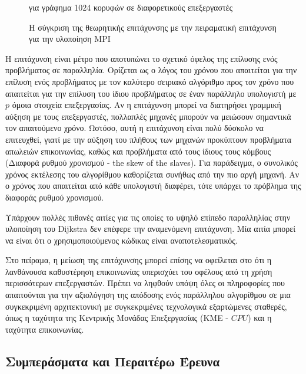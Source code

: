 \documentclass[12pt,a4paper]{article} %
\begin{document}
{\begin{figure}[H]
\caption{Η σύγκριση της θεωρητικής επιτάχυνσης με την πειραματική επιτάχυνση για την υλοποίηση MPI} για γράφημα 1024 κορυφών σε διαφορετικούς επεξεργαστές
\label{fig:speedup_processors}
\end{figure}
 
Η επιτάχυνση είναι μέτρο που αποτυπώνει το σχετικό όφελος της επίλυσης ενός προβλήματος σε παραλληλία. Ορίζεται ως ο λόγος του χρόνου που απαιτείται για την επίλυση ενός προβλήματος με τον καλύτερο σειριακό αλγόριθμο προς τον χρόνο που απαιτείται για την επίλυση του ίδιου προβλήματος σε έναν παράλληλο υπολογιστή με $p$ όμοια στοιχεία επεξεργασίας. Αν η επιτάχυνση μπορεί να διατηρήσει γραμμική αύξηση με τους επεξεργαστές, πολλαπλές μηχανές μπορούν να μειώσουν σημαντικά τον απαιτούμενο χρόνο. Ωστόσο, αυτή η επιτάχυνση είναι πολύ δύσκολο να επιτευχθεί, γιατί με την αύξηση του πλήθους των μηχανών προκύπτουν προβλήματα απωλειών επικοινωνίας, καθώς και προβλήματα από τους ίδιους τους κόμβους (Διαφορά ρυθμού χρονισμού - the skew of the slaves). Για παράδειγμα, ο συνολικός χρόνος εκτέλεσης του αλγορίθμου καθορίζεται συνήθως από την πιο αργή μηχανή. Αν ο χρόνος που απαιτείται από κάθε υπολογιστή διαφέρει, τότε υπάρχει το πρόβλημα της διαφοράς ρυθμού χρονισμού.

Υπάρχουν πολλές πιθανές αιτίες για τις οποίες το υψηλό επίπεδο παραλληλίας στην υλοποίηση του Dijkstra δεν επέφερε την αναμενόμενη επιτάχυνση. Μία αιτία μπορεί να είναι ότι ο χρησιμοποιούμενος κώδικας είναι αναποτελεσματικός. 

Στο πείραμα, η μείωση της επιτάχυνσης μπορεί επίσης να οφείλεται στο ότι η λανθάνουσα καθυστέρηση επικοινωνίας υπερισχύει του οφέλους από τη χρήση περισσότερων επεξεργαστών. Πρέπει να ληφθούν υπόψη όλες οι πληροφορίες που απαιτούνται για την αξιολόγηση της απόδοσης ενός παράλληλου αλγορίθμου σε μια συγκεκριμένη αρχιτεκτονική με συγκεκριμένες τεχνολογικά εξαρτώμενες σταθερές, όπως η ταχύτητα της Κεντρικής Μονάδας Επεξεργασίας (ΚΜΕ - $CPU$) και η ταχύτητα επικοινωνίας.

\subsection{Συμπεράσματα και Περαιτέρω Έρευνα}

}
\end{document}

